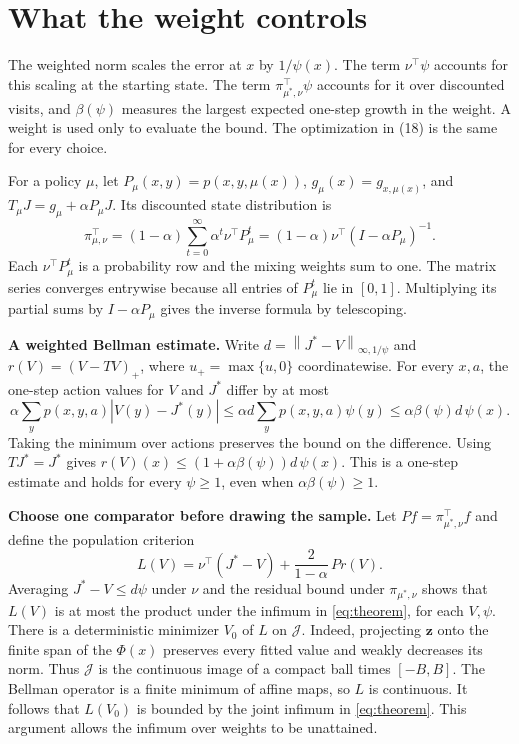 \documentclass[12pt,a4paper]{article}
\newcommand{\lead}[1]{\par\smallskip\noindent\textbf{#1}\enspace}
\newcommand{\piopt}{\pi_{\mu^*,\nu}}
\newcommand{\class}{\mathcal J}
\newcommand{\wn}[1]{\left\|#1\right\|_{\infty,1/\psi}}
\begin{document}
\newpage
\section*{What the weight controls}
The weighted norm scales the error at \(x\) by \(1/\psi(x)\). The term
\(\nu^\top\psi\) accounts for this scaling at the starting state.
The term \(\piopt^\top\psi\) accounts for it over discounted visits,
and \(\beta(\psi)\) measures the largest expected one-step growth in the
weight. A weight is used only to evaluate the bound. The optimization
in (18) is the same for every choice.

For a policy \(\mu\), let \(P_\mu(x,y)=p(x,y,\mu(x))\),
\(g_\mu(x)=g_{x,\mu(x)}\), and \(T_\mu J=g_\mu+\alpha P_\mu J\).
Its discounted state distribution is
\begin{equation}
 \pi_{\mu,\nu}^\top=(1-\alpha)\sum_{t=0}^\infty\alpha^t\nu^\top P_\mu^t
       =(1-\alpha)\nu^\top(I-\alpha P_\mu)^{-1}.
 \tag{17}\label{eq:occupancy}
\end{equation}
Each \(\nu^\top P_\mu^t\) is a probability row and the mixing weights sum
to one. The matrix series converges entrywise because all entries of
\(P_\mu^t\) lie in \([0,1]\). Multiplying its partial sums by
\(I-\alpha P_\mu\) gives the inverse formula by telescoping.

\lead{A weighted Bellman estimate.}
Write \(d=\wn{J^*-V}\) and \(r(V)=(V-TV)_+\), where \(u_+=\max\{u,0\}\)
coordinatewise. For every \(x,a\), the one-step action values for \(V\)
and \(J^*\) differ by at most
\[
 \alpha\sum_y p(x,y,a)|V(y)-J^*(y)|
 \le \alpha d\sum_y p(x,y,a)\psi(y)
 \le \alpha\beta(\psi)d\,\psi(x).
\]
Taking the minimum over actions preserves the bound on the difference.
Using \(TJ^*=J^*\) gives \(r(V)(x)\le(1+\alpha\beta(\psi))d\,\psi(x)\).
This is a one-step estimate and holds for every \(\psi\ge1\), even when
\(\alpha\beta(\psi)\ge1\).

\lead{Choose one comparator before drawing the sample.}
Let \(P f=\piopt^\top f\) and define the population criterion
\[
 L(V)=\nu^\top(J^*-V)+\frac{2}{1-\alpha}\,P r(V).
\]
Averaging \(J^*-V\le d\psi\) under \(\nu\) and the residual bound under
\(\piopt\) shows that \(L(V)\) is at most the product under the infimum
in \eqref{eq:theorem}, for each \(V,\psi\).
There is a deterministic minimizer \(V_0\) of \(L\) on \(\class\).
Indeed, projecting \(\mathbf z\) onto the finite span of the
\(\Phi(x)\) preserves every fitted value and weakly decreases its norm.
Thus \(\class\) is the continuous image of a compact ball times \([-B,B]\).
The Bellman operator is a finite minimum of affine maps, so \(L\) is
continuous. It follows that \(L(V_0)\) is bounded by the joint infimum
in \eqref{eq:theorem}. This argument allows the infimum over weights to
be unattained.
\end{document}
